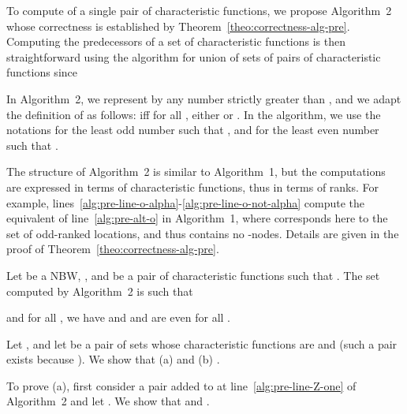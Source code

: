 \documentclass{LMCS}
\begin{document}
\noindent To compute  of a single pair of
characteristic functions, we propose Algorithm~2 whose correctness is
established by Theorem~\ref{theo:correctness-alg-pre}. Computing the
predecessors of a set of characteristic functions is then
straightforward using the algorithm for union of sets of pairs of
characteristic functions since

In Algorithm~2, we represent  by any number
strictly greater than , and we adapt the definition of  as
follows:  iff for all , either  or . In the algorithm, we use the notations
 for the least odd number  such that , and
 for the least even number  such that .

The structure of Algorithm~2
is similar to Algorithm~1, but the computations are expressed 
in terms of characteristic functions, thus in terms of ranks. For example,
\mbox{lines~\ref{alg:pre-line-o-alpha}-\ref{alg:pre-line-o-not-alpha}} compute
the equivalent of line~\ref{alg:pre-alt-o} in Algorithm~1,
where  corresponds here to the set of odd-ranked locations,
and thus contains no -nodes. Details are given in the proof of 
Theorem~\ref{theo:correctness-alg-pre}.

\begin{thm}\label{theo:correctness-alg-pre}
  Let  be a NBW, 
  , and  be a pair of characteristic functions 
  such that .
  The set  computed by
  Algorithm~2 is such that 
  
  and for all , we have 
  and  and  are even for all .
\end{thm} 

\proof 
Let ,
and let  be a pair of sets whose characteristic functions
are  and  (such a pair exists because
).
We show that (a)  and
(b) .

To prove (a), first consider a pair  added to  at 
line~\ref{alg:pre-line-Z-one} of Algorithm~2 and let 
. We show that 
 and .
\end{document}
